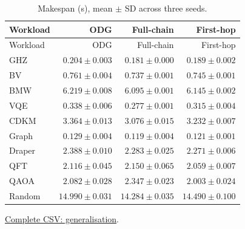 \begin{center}\small
\begin{longtable}{lrrr}
\caption{Makespan (s), mean $\pm$ SD across three seeds.}\\
\toprule
Workload & ODG & Full-chain & First-hop \\
\midrule\endfirsthead
\toprule
Workload & ODG & Full-chain & First-hop \\
\midrule\endhead
GHZ & $0.204 \pm 0.003$ & $0.181 \pm 0.000$ & $0.189 \pm 0.002$ \\
BV & $0.761 \pm 0.004$ & $0.737 \pm 0.001$ & $0.745 \pm 0.001$ \\
BMW & $6.219 \pm 0.008$ & $6.095 \pm 0.001$ & $6.145 \pm 0.002$ \\
VQE & $0.338 \pm 0.006$ & $0.277 \pm 0.001$ & $0.315 \pm 0.004$ \\
CDKM & $3.364 \pm 0.013$ & $3.076 \pm 0.015$ & $3.232 \pm 0.007$ \\
Graph & $0.129 \pm 0.004$ & $0.119 \pm 0.004$ & $0.121 \pm 0.001$ \\
Draper & $2.388 \pm 0.010$ & $2.283 \pm 0.025$ & $2.271 \pm 0.006$ \\
QFT & $2.116 \pm 0.045$ & $2.150 \pm 0.065$ & $2.059 \pm 0.007$ \\
QAOA & $2.082 \pm 0.028$ & $2.347 \pm 0.023$ & $2.003 \pm 0.024$ \\
Random & $14.990 \pm 0.031$ & $14.284 \pm 0.035$ & $14.490 \pm 0.100$ \\
\bottomrule\end{longtable}\end{center}
{\footnotesize \href{https://github.com/sanjeevkrishnaa/Compiler-Driven-ACE/blob/codex/ace-scheduler-correctness/docs/latex/oct25_pre_golden/data/generalisation.csv}{Complete CSV: generalisation}. }

